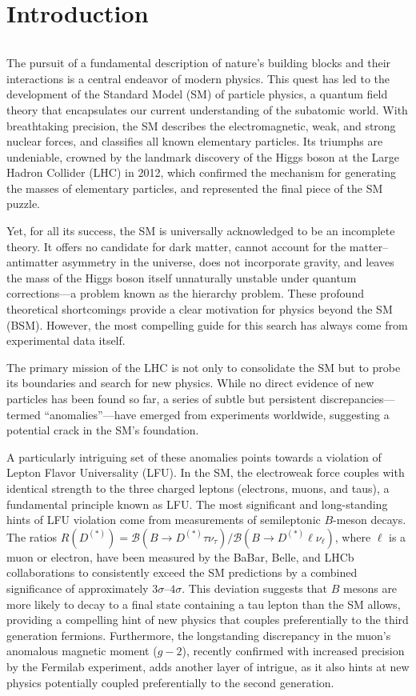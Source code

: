 \chapter*{Introduction}
$ $ 

The pursuit of a fundamental description of nature's building blocks and their interactions is a central endeavor of modern physics. This quest has led to the development of the Standard Model (SM) of particle physics, a quantum field theory that encapsulates our current understanding of the subatomic world. With breathtaking precision, the SM describes the electromagnetic, weak, and strong nuclear forces, and classifies all known elementary particles. Its triumphs are undeniable, crowned by the landmark discovery of the Higgs boson at the Large Hadron Collider (LHC) in 2012, which confirmed the mechanism for generating the masses of elementary particles, and represented the final piece of the SM puzzle.

Yet, for all its success, the SM is universally acknowledged to be an incomplete theory. It offers no candidate for dark matter, cannot account for the matter--antimatter asymmetry in the universe, does not incorporate gravity, and leaves the mass of the Higgs boson itself unnaturally unstable under quantum corrections—a problem known as the hierarchy problem. These profound theoretical shortcomings provide a clear motivation for physics beyond the SM (BSM). However, the most compelling guide for this search has always come from experimental data itself.

The primary mission of the LHC is not only to consolidate the SM but to probe its boundaries and search for new physics. While no direct evidence of new particles has been found so far, a series of subtle but persistent discrepancies—termed ``anomalies''—have emerged from experiments worldwide, suggesting a potential crack in the SM's foundation.

A particularly intriguing set of these anomalies points towards a violation of Lepton Flavor Universality (LFU). In the SM, the electroweak force couples with identical strength to the three charged leptons (electrons, muons, and taus), a fundamental principle known as LFU. The most significant and long-standing hints of LFU violation come from measurements of semileptonic $B$-meson decays. The ratios $R(D^{(*)}) = \mathcal{B}(B \to D^{(*)} \tau \nu_\tau) / \mathcal{B}(B \to D^{(*)} \ell \nu_\ell)$, where $\ell$ is a muon or electron, have been measured by the BaBar, Belle, and LHCb collaborations to consistently exceed the SM predictions by a combined significance of approximately $3\sigma$--$4\sigma$. This deviation suggests that $B$ mesons are more likely to decay to a final state containing a tau lepton than the SM allows, providing a compelling hint of new physics that couples preferentially to the third generation fermions. Furthermore, the longstanding discrepancy in the muon's anomalous magnetic moment ($g-2$), recently confirmed with increased precision by the Fermilab experiment, adds another layer of intrigue, as it also hints at new physics potentially coupled preferentially to the second generation.

